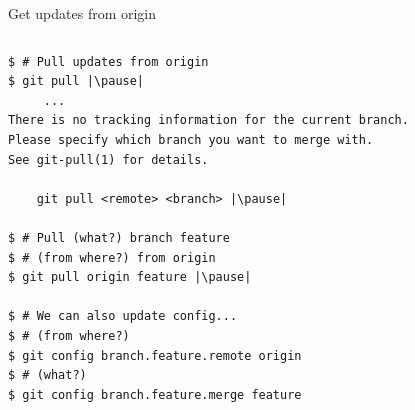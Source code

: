 \begin{frame}[fragile]{Get updates from origin}
\begin{columns}
	\begin{column}{0.4\textwidth}
	\begin{lstlisting}
$ # Pull updates from origin
$ git pull |\pause|
     ...
There is no tracking information for the current branch.
Please specify which branch you want to merge with.
See git-pull(1) for details.

    git pull <remote> <branch> |\pause|
    
$ # Pull (what?) branch feature 
$ # (from where?) from origin
$ git pull origin feature |\pause|

$ # We can also update config...
$ # (from where?)
$ git config branch.feature.remote origin
$ # (what?)
$ git config branch.feature.merge feature


\end{lstlisting}
\end{column}
\end{columns}
\end{frame}
